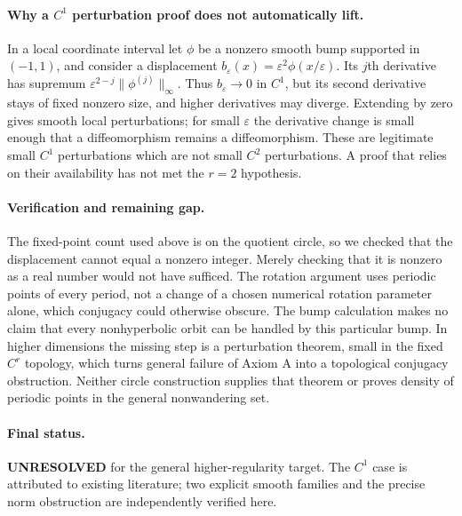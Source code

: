 \documentclass[11pt,a4paper]{article}
\begin{document}
\paragraph{Why a $C^1$ perturbation proof does not automatically lift.}
In a local coordinate interval let $\phi$ be a nonzero smooth bump
supported in $(-1,1)$, and consider a displacement
$b_\varepsilon(x)=\varepsilon^2\phi(x/\varepsilon)$.
Its $j$th derivative has supremum
$\varepsilon^{2-j}\|\phi^{(j)}\|_\infty$.
Thus $b_\varepsilon\to0$ in $C^1$, but its second derivative stays
of fixed nonzero size, and higher derivatives may diverge. Extending
by zero gives smooth local perturbations; for small $\varepsilon$
the derivative change is small enough that a diffeomorphism remains
a diffeomorphism. These are legitimate small $C^1$ perturbations
which are not small $C^2$ perturbations. A proof that relies on their
availability has not met the $r=2$ hypothesis.

\paragraph{Verification and remaining gap.}
The fixed-point count used above is on the quotient circle, so we checked
that the displacement cannot equal a nonzero integer. Merely checking
that it is nonzero as a real number would not have sufficed. The
rotation argument uses periodic points of every period, not a change
of a chosen numerical rotation parameter alone, which conjugacy could
otherwise obscure. The bump calculation makes no claim that every
nonhyperbolic orbit can be handled by this particular bump. In higher
dimensions the missing step is a perturbation theorem, small in the
fixed $C^r$ topology, which turns general failure of Axiom A into a
topological conjugacy obstruction. Neither circle construction supplies
that theorem or proves density of periodic points in the general
nonwandering set.

\paragraph{Final status.}
\textbf{UNRESOLVED} for the general higher-regularity target. The
$C^1$ case is attributed to existing literature; two explicit smooth
families and the precise norm obstruction are independently verified here.
\end{document}
